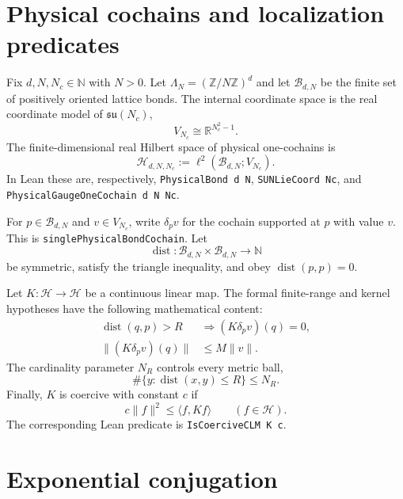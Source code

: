 \documentclass[11pt]{article}
\theoremstyle{definition}
\newcommand{\R}{\mathbb{R}}
\newcommand{\N}{\mathbb{N}}
\newcommand{\dist}{\operatorname{dist}}
\newcommand{\inn}[2]{\langle #1,#2\rangle}
\newcommand{\norm}[1]{\lVert #1\rVert}
\newcommand{\lean}[1]{\texttt{#1}}
\begin{document}
\section{Physical cochains and localization predicates}\label{sec:setting}

Fix $d,N,N_c\in\N$ with $N>0$.  Let $\Lambda_N=(\mathbb Z/N\mathbb Z)^d$ and
let $\mathcal B_{d,N}$ be the finite set of positively oriented lattice bonds.
The internal coordinate space is the real coordinate model of
$\mathfrak{su}(N_c)$,
\[
  V_{N_c}\cong\R^{N_c^2-1}.
\]
The finite-dimensional real Hilbert space of physical one-cochains is
\[
  \mathcal H_{d,N,N_c}
  :=\ell^2(\mathcal B_{d,N};V_{N_c}).
\]
In Lean these are, respectively,
\lean{PhysicalBond d N}, \lean{SUNLieCoord Nc}, and
\lean{PhysicalGaugeOneCochain d N Nc}.

For $p\in\mathcal B_{d,N}$ and $v\in V_{N_c}$, write $\delta_pv$ for the
cochain supported at $p$ with value $v$.  This is
\lean{singlePhysicalBondCochain}.  Let
\[
  \dist:\mathcal B_{d,N}\times\mathcal B_{d,N}\longrightarrow\N
\]
be symmetric, satisfy the triangle inequality, and obey
$\dist(p,p)=0$.

Let $K:\mathcal H\to\mathcal H$ be a continuous linear map.  The formal
finite-range and kernel hypotheses have the following mathematical content:
\begin{align}
  \dist(q,p)>R &\Longrightarrow (K\delta_pv)(q)=0,
     \label{eq:range}\\
  \norm{(K\delta_pv)(q)}&\le M\norm v.
     \label{eq:kernel}
\end{align}
The cardinality parameter $N_R$ controls every metric ball,
\begin{equation}\label{eq:ball}
  \#\{y:\dist(x,y)\le R\}\le N_R.
\end{equation}
Finally, $K$ is coercive with constant $c$ if
\begin{equation}\label{eq:coercive}
  c\norm f^2\le\inn f{Kf}\qquad(f\in\mathcal H).
\end{equation}
The corresponding Lean predicate is \lean{IsCoerciveCLM K c}.

\section{Exponential conjugation}\label{sec:tilt}
\end{document}

